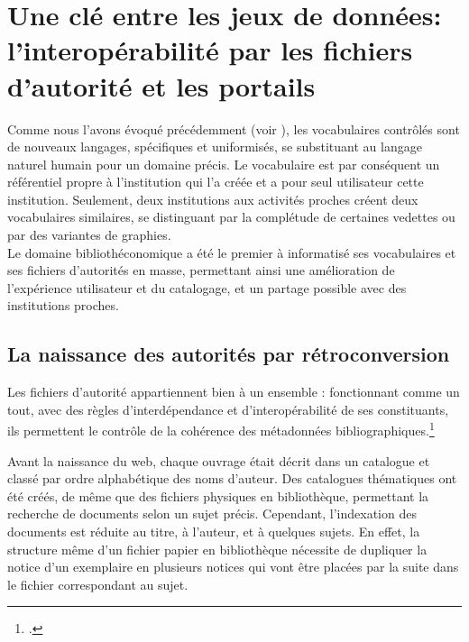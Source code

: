 \section{\label{I-A-3}Une clé entre les jeux de données: l'interopérabilité par les fichiers d'autorité et les portails}

Comme nous l'avons évoqué précédemment (voir ), les vocabulaires contrôlés sont de nouveaux langages, spécifiques et uniformisés, se substituant au langage naturel humain pour un domaine précis. Le vocabulaire est par conséquent un référentiel propre à l'institution qui l'a créée et a pour seul utilisateur cette institution. Seulement, deux institutions aux activités proches créent deux vocabulaires similaires, se distinguant par la complétude de certaines vedettes ou par des variantes de graphies.\\
Le domaine bibliothéconomique a été le premier à informatisé ses vocabulaires et ses fichiers d'autorités en masse, permettant ainsi une amélioration de l'expérience utilisateur et du catalogage, et un partage possible avec des institutions proches.

\subsection{\label{I-A-3-a}La naissance des autorités par rétroconversion}

\begin{citationLongue}
	Les fichiers d'autorité appartiennent bien à un	ensemble : fonctionnant comme un tout, avec des règles d’interdépendance et d’interopérabilité de ses constituants, ils permettent le contrôle de	la cohérence des métadonnées bibliographiques.\footcite[p.6]{aymonin_arabesques_2017}
\end{citationLongue}

Avant la naissance du web, chaque ouvrage était décrit dans un catalogue et classé par ordre alphabétique des noms d'auteur. Des catalogues thématiques ont été créés, de même que des fichiers physiques en bibliothèque, permettant la recherche de documents selon un sujet précis. Cependant, l'indexation des documents est réduite au titre, à l'auteur, et à quelques sujets. En effet, la structure même d'un fichier papier en bibliothèque nécessite de dupliquer la notice d'un exemplaire en plusieurs notices qui vont être placées par la suite dans le fichier correspondant au sujet.\\

